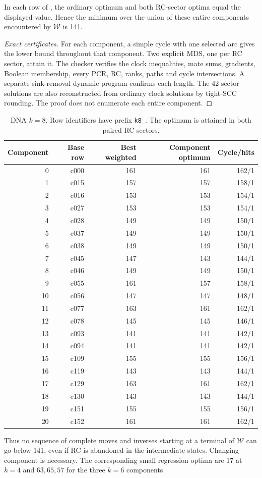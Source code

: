 \begin{proposition}
\label{prop:component-optima}
In each row of , the ordinary optimum
and both RC-sector optima equal the displayed value. Hence the
minimum over the union of these entire components encountered by $\mathcal W$ is 141.
\end{proposition}
\begin{proof}[Exact certificates]
For each component, a simple cycle with one selected arc gives
the lower bound throughout that component. Two explicit MDS,
one per RC sector, attain it. The checker verifies the clock
inequalities, mate sums, gradients, Boolean membership, every PCR,
RC, ranks, paths and cycle intersections. A separate sink-removal
dynamic program confirms each length. The 42 sector solutions
are also reconstructed from ordinary clock solutions by tight-SCC
rounding. The proof does not enumerate each entire component.
\end{proof}

\begin{table}[ht]
\centering\small
\begin{tabular}{rrrrr}
\toprule
Component & Base row & Best weighted & Component optimum & Cycle/hits\\
\midrule
0 & c000 &161&161&162/1\\
1 & c015 &157&157&158/1\\
2 & c016 &153&153&154/1\\
3 & c027 &153&153&154/1\\
4 & c028 &149&149&150/1\\
5 & c037 &149&149&150/1\\
6 & c038 &149&149&150/1\\
7 & c045 &147&143&144/1\\
8 & c046 &149&149&150/1\\
9 & c055 &161&157&158/1\\
10& c056 &147&147&148/1\\
11& c077 &163&161&162/1\\
12& c078 &145&145&146/1\\
13& c093 &141&141&142/1\\
14& c094 &141&141&142/1\\
15& c109 &155&155&156/1\\
16& c119 &143&143&144/1\\
17& c129 &163&161&162/1\\
18& c130 &143&143&144/1\\
19& c151 &155&155&156/1\\
20& c152 &161&161&162/1\\
\bottomrule
\end{tabular}
\caption{DNA $k=8$. Row identifiers have prefix \texttt{k8\_}.
The optimum is attained in both paired RC sectors.}
\label{tab:component-optima}
\end{table}
Thus no sequence of complete moves and inverses starting at a
terminal of $\mathcal W$ can go below 141, even if RC is abandoned in
the intermediate states. Changing component is necessary.
The corresponding small regression optima are 17 at $k=4$ and
$63,65,57$ for the three $k=6$ components.

